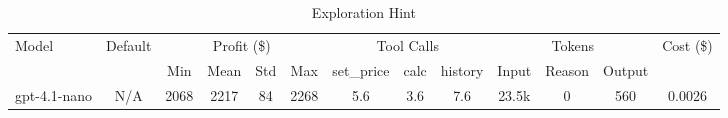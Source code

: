 \begin{table}[h]
\centering
\small
\caption{Exploration Hint}
\begin{tabular}{|l|c|c|c|c|c|c|c|c|c|c|c|c|}
\hline
\multirow{2}{*}{Model} & \multirow{2}{*}{Default} & \multicolumn{4}{c|}{Profit (\$)} & \multicolumn{3}{c|}{Tool Calls} & \multicolumn{3}{c|}{Tokens} & \multirow{2}{*}{Cost (\$)} \\
\cline{3-12}
& & Min & Mean & Std & Max & set\_price & calc & history & Input & Reason & Output & \\
\hline
gpt-4.1-nano & N/A & 2068 & 2217 & 84 & 2268 & 5.6 & 3.6 & 7.6 & 23.5k & 0 & 560 & 0.0026 \\
\hline
\end{tabular}
\end{table}